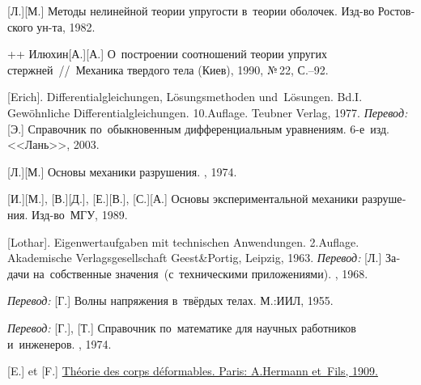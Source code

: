 \begin{thebibliography}{123}
\begin{otherlanguage}{russian}
[Л.][М.] Методы нелинейной теории упругости в~теории оболочек.
Изд\hbox{-}во Ростовского ун\hbox{-}та,
1982. 

++ {Илюхин}[А.][А.] О~построении соотношений теории упругих стержней~//~Механика твердого тела (Киев), 1990, №\,22, С.\hbox{--}92.

[Erich]. Differentialgleichungen, Lösungsmethoden und~Lö\-sun\-gen. Bd.\:I. Gewöhnliche Differentialgleichungen. 10.\:Auflage. Teubner Verlag, 1977. 
\emph{Перевод:} [Э.] Справочник по~обыкновенным дифференциальным уравнениям. 6\hbox{-}е~изд. <<Лань>>, 2003. 

[Л.][М.] Основы механики разрушения. \naukapublisher, 1974. 

[И.][М.], [В.][Д.], [Е.][В.], [С.][А.]
Основы экспериментальной механики разрушения. Изд\hbox{-}во~МГУ, 1989. 

[Lothar]. Eigenwertaufgaben mit technischen Anwendungen. 2.\:Auflage. Akademische Verlagsgesellschaft Geest\;\&\;Portig, Leipzig, 1963. 
\emph{Перевод:} [Л.] Задачи на~собственные значения~(с~техническими приложениями). \naukapublisher, 1968. 

\emph{Перевод:} [Г.] Волны напряжения в~твёрдых телах. М.:\;ИИЛ, 1955. 

\emph{Перевод:} [Г.], [Т.] Справочник по~математике для научных работников и~инженеров. \naukapublisher, 1974. 

[E.] et [F.] \href{https://jscholarship.library.jhu.edu/bitstream/handle/1774.2/34209/31151000327233.pdf}{Théorie des corps déformables. Paris: A.\:Hermann et~Fils, 1909.} 


\end{otherlanguage}
\end{thebibliography}
